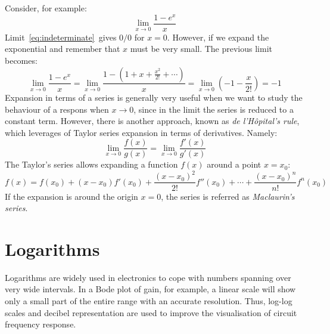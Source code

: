 Consider, for example:
\begin{equation}
\lim_{x\rightarrow 0}\frac{1-e^x}{x}
\label{eq:indeterminate}
\end{equation}
Limit~\ref{eq:indeterminate} gives $0/0$ for $x=0$. However, if we expand the exponential and remember that $x$ must be very small. The previous limit becomes:
\begin{equation}
\lim_{x\rightarrow 0}\frac{1-e^x}{x}=\lim_{x\rightarrow 0}\frac{1-\left(1 + x + \frac{x^2}{2!}+\cdots\right)}{x} =\lim_{x\rightarrow 0}\left(-1-\frac{x}{2!}\right)=-1
\end{equation}
Expansion in terms of a series is generally very useful when we want to study the behaviour of a respons when $x\rightarrow0$, since in the limit the series is reduced to a constant term. However, there is another approach, known as \emph{de l'Hôpital's rule}, which leverages of Taylor series expansion in terms of derivatives. Namely:
\begin{equation}
\lim_{x\rightarrow 0}\frac{f(x)}{g(x)} = \lim_{x\rightarrow 0}\frac{f'(x)}{g'(x)}
\end{equation}
The Taylor's series allows expanding a function $f(x)$ around a point $x=x_0$:
\begin{equation}
f(x) = f(x_0) + (x-x_0)f'(x_0)+\frac{(x-x_0)^2}{2!}f''(x_0)+\cdots+\frac{(x-x_0)^n}{n!}f^n(x_0)
\end{equation} 
If the expansion is around the origin $x=0$, the series is referred as \emph{Maclaurin's series}.

\section{Logarithms}
Logarithms are widely used in electronics to cope with numbers spanning over very wide intervals. In a Bode plot of gain, for example, a linear scale will show only a small part of the entire range with an accurate resolution. Thus, log-log scales and decibel representation are used to improve the visualisation of circuit frequency response.

